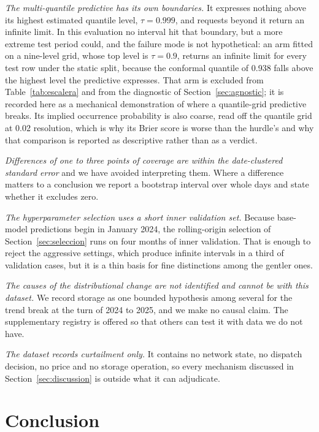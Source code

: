 \documentclass[preprint,3p,times]{elsarticle}
\begin{document}
\emph{The multi-quantile predictive has its own boundaries.} It expresses nothing above its highest estimated quantile level, $\tau=0.999$, and requests beyond it return an infinite limit. In this evaluation no interval hit that boundary, but a more extreme test period could, and the failure mode is not hypothetical: an arm fitted on a nine-level grid, whose top level is $\tau=0.9$, returns an infinite limit for every test row under the static split, because the conformal quantile of 0.938 falls above the highest level the predictive expresses. That arm is excluded from Table~\ref{tab:escalera} and from the diagnostic of Section~\ref{sec:agnostic}; it is recorded here as a mechanical demonstration of where a quantile-grid predictive breaks. Its implied occurrence probability is also coarse, read off the quantile grid at 0.02 resolution, which is why its Brier score is worse than the hurdle's and why that comparison is reported as descriptive rather than as a verdict.

\emph{Differences of one to three points of coverage are within the date-clustered standard error} and we have avoided interpreting them. Where a difference matters to a conclusion we report a bootstrap interval over whole days and state whether it excludes zero.

\emph{The hyperparameter selection uses a short inner validation set.} Because base-model predictions begin in January 2024, the rolling-origin selection of Section~\ref{sec:seleccion} runs on four months of inner validation. That is enough to reject the aggressive settings, which produce infinite intervals in a third of validation cases, but it is a thin basis for fine distinctions among the gentler ones.

\emph{The causes of the distributional change are not identified and cannot be with this dataset.} We record storage as one bounded hypothesis among several for the trend break at the turn of 2024 to 2025, and we make no causal claim. The supplementary registry is offered so that others can test it with data we do not have.

\emph{The dataset records curtailment only.} It contains no network state, no dispatch decision, no price and no storage operation, so every mechanism discussed in Section~\ref{sec:discussion} is outside what it can adjudicate.

\section{Conclusion}
\label{sec:conclusion}
\end{document}
